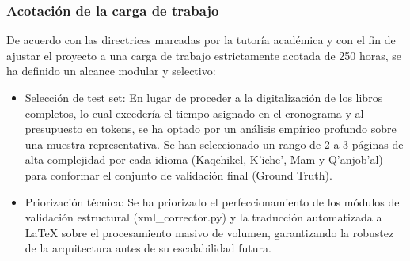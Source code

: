 \subsubsection{Acotación de la carga de trabajo}
De acuerdo con las directrices marcadas por la tutoría académica y con el fin de ajustar el proyecto a una carga de trabajo estrictamente acotada de 250 horas, se ha definido un alcance modular y selectivo:
\begin{itemize}
    \item Selección de test set: En lugar de proceder a la digitalización de los libros completos, lo cual excedería el tiempo asignado en el cronograma y al presupuesto en tokens, se ha optado por un análisis empírico profundo sobre una muestra representativa. Se han seleccionado un rango de 2 a 3 páginas de alta complejidad por cada idioma (Kaqchikel, K’iche’, Mam y Q’anjob’al) para conformar el conjunto de validación final (Ground Truth).
    \item Priorización técnica: Se ha priorizado el perfeccionamiento de los módulos de validación estructural (xml\_corrector.py) y la traducción automatizada a LaTeX sobre el procesamiento masivo de volumen, garantizando la robustez de la arquitectura antes de su escalabilidad futura.
\end{itemize}

